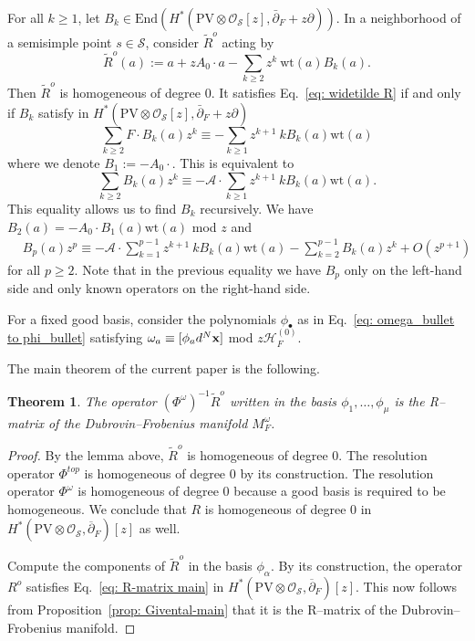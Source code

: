 \documentclass[12pt,a4paper]{amsart}
\newcommand{\bx}{{\bf x}}
\newcommand{\wt}{\mathrm{wt}}
\def\A{{\mathcal A}}
\def\H{{\mathcal H}}
\def\O{{\mathcal O}}
\renewcommand{\S}{{\mathcal S}}
\newcommand{\p}{{\partial}}
\newcommand{\<}{\left<}
\renewcommand{\>}{\right>}
\newcommand{\PV}{{\mathrm{PV}}}
\newcommand{\End}{{\mathrm{End}}}
\newtheorem{theorem}{Theorem}[section]
\numberwithin{equation}{section}
\begin{document}
For all $k \ge 1$, let $B_k \in \End(H^\ast( \PV \otimes \O_\S[z], \bar \p_F + z \p))$.
In a neighborhood of a semisimple point $s \in \S$, consider  $\widetilde R^o$ acting by
\[
    \widetilde R^o(a) := a + z A_0\cdot a - \sum_{k \ge 2} z^k \ \wt(a) B_k(a).
\]
Then $\widetilde R^o$ is homogeneous of degree $0$. It satisfies Eq.~\eqref{eq: widetilde R} if and only if $B_k$ satisfy in $H^\ast( \PV \otimes \O_\S[z], \bar \p_F + z \p)$
\[
    \sum_{k \ge 2} F \cdot B_k(a) z^k \equiv - \sum_{k \ge 1} z^{k+1} \ k B_k(a) \wt(a)
\]
where we denote $B_1 := - A_0 \cdot$. This is equivalent to
\[
 \sum_{k \ge 2} B_k(a) z^k \equiv  - \A \cdot \sum_{k \ge 1} z^{k+1} \ k B_k(a) \wt(a).
\]
This equality allows us to find $B_k$ recursively. We have $B_2(a) = - A_0 \cdot B_1(a) \wt(a)$ mod $z$ and
\begin{align*}
    & B_p(a) z^p \equiv  - \A \cdot \sum_{k = 1}^{p-1} z^{k+1} \ k B_k(a) \wt(a) - \sum_{k = 2}^{p-1} B_k(a) z^k + O(z^{p+1})
\end{align*}
for all $p \ge 2$. Note that in the previous equality we have $B_p$ only on the left-hand side and only known operators on the right-hand side.

For a fixed good basis, consider the polynomials $\phi_\bullet$ as in Eq.~\eqref{eq: omega_bullet to phi_bullet} satisfying $\omega_a \equiv [ \phi_a d^N \bx]$ mod $z \H_F^{(0)}$.

The main theorem of the current paper is the following.
\begin{theorem}\label{theorem: R--matrix}
    The operator $(\Phi^\omega )^{-1} \widetilde R^o$ written in the basis $\phi_1,\dots,\phi_\mu$ is the R--matrix of the Dubrovin--Frobenius manifold $M^\omega_F$.
\end{theorem}
\begin{proof}
    By the lemma above, $\widetilde R^o$ is homogeneous of degree $0$. The resolution operator $\Phi^{top}$ is homogeneous of degree $0$ by its construction. The resolution operator $\Phi^{\omega}$ is homogeneous of degree $0$ because a good basis is required to be homogeneous. We conclude that $R$ is homogeneous of degree $0$ in $H^\ast(\PV\otimes\O_\S,\overline\p_F)[z]$ as well.

    Compute the components of $\widetilde R^o$ in the basis $\phi_\alpha$.
    By its construction, the operator $R^o$ satisfies Eq.~\eqref{eq: R-matrix main} in $H^\ast(\PV\otimes\O_\S,\overline\p_F)[z]$.
    This now follows from Proposition~\ref{prop: Givental-main} that it is the R--matrix of the Dubrovin--Frobenius manifold.
\end{proof}
\end{document}
